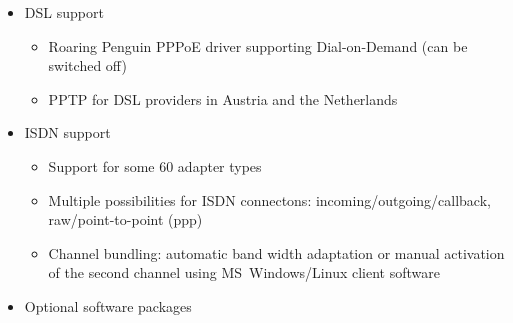 \begin{itemize}
\item DSL support

\begin{itemize}
\item Roaring Penguin PPPoE driver supporting Dial-on-Demand (can be switched
      off)
\item PPTP for DSL providers in Austria and the Netherlands
\end{itemize}

\item ISDN support

\begin{itemize}
\item Support for some 60 adapter types
\item Multiple possibilities for ISDN connectons: incoming/outgoing/callback,
      raw/point-to-point (ppp)
\item Channel bundling: automatic band width adaptation or manual activation of
      the second channel using MS~Windows/Linux client software
\end{itemize}

\item Optional software packages


\end{itemize}
